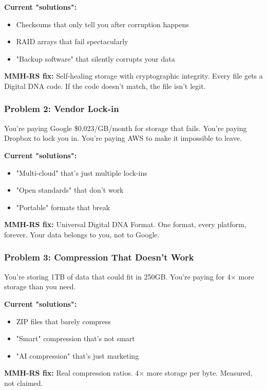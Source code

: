 \documentclass[11pt,a4paper]{article}
\begin{document}
	\textbf{Current "solutions":}
	\begin{itemize}
		\item Checksums that only tell you after corruption happens
		\item RAID arrays that fail spectacularly
		\item "Backup software" that silently corrupts your data
	\end{itemize}

	\textbf{MMH-RS fix:} Self-healing storage with cryptographic integrity. Every file gets a Digital DNA code. If the code doesn't match, the file isn't legit.

	\subsubsection{Problem 2: Vendor Lock-in}
	You're paying Google \$0.023/GB/month for storage that fails. You're paying Dropbox to lock you in. You're paying AWS to make it impossible to leave.

	\textbf{Current "solutions":}
	\begin{itemize}
		\item "Multi-cloud" that's just multiple lock-ins
		\item "Open standards" that don't work
		\item "Portable" formats that break
	\end{itemize}

	\textbf{MMH-RS fix:} Universal Digital DNA Format. One format, every platform, forever. Your data belongs to you, not to Google.

	\subsubsection{Problem 3: Compression That Doesn't Work}
	You're storing 1TB of data that could fit in 250GB. You're paying for 4× more storage than you need.

	\textbf{Current "solutions":}
	\begin{itemize}
		\item ZIP files that barely compress
		\item "Smart" compression that's not smart
		\item "AI compression" that's just marketing
	\end{itemize}

	\textbf{MMH-RS fix:} Real compression ratios. 4× more storage per byte. Measured, not claimed.
\end{document}
